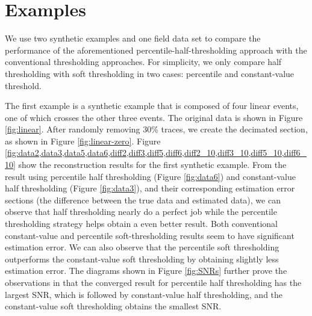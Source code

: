 \section{Examples}
We use two synthetic examples and one field data set to compare the performance of the aforementioned percentile-half-thresholding approach with the conventional thresholding approaches. For simplicity, we only compare half thresholding with soft thresholding in two cases: percentile and constant-value threshold. 

The first example is a synthetic example that is composed of four linear events, one of which crosses the other three events. The original data is shown in Figure \ref{fig:linear}. After randomly removing 30\% traces, we create the decimated section, as shown in Figure \ref{fig:linear-zero}. Figure \ref{fig:data2,data3,data5,data6,diff2,diff3,diff5,diff6,diff2_10,diff3_10,diff5_10,diff6_10} show the reconstruction results for the first synthetic example. From the result using percentile half thresholding (Figure \ref{fig:data6}) and constant-value half thresholding (Figure \ref{fig:data3}), and their corresponding estimation error sections (the difference between the true data and estimated data), we can observe that half thresholding nearly do a perfect job while the percentile thresholding strategy helps obtain a even better result. Both conventional constant-value and percentile soft-thresholding results seem to have significant estimation error.  We can also observe that the percentile soft thresholding outperforms the constant-value soft thresholding by obtaining slightly less estimation error.    The diagrams shown in Figure \ref{fig:SNRs} further prove the observations in that the converged result for percentile half thresholding has the largest SNR, which is followed by constant-value half thresholding, and the constant-value soft thresholding obtains the smallest SNR.

